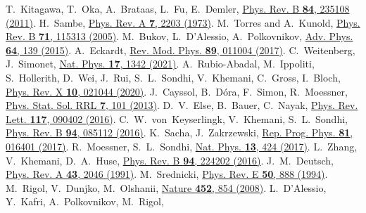 \documentclass[prl,aps,twocolumn,notitlepage,10pt]{revtex4-1}
\begin{document}
\begin{references}
  T.~Kitagawa, T.~Oka, A.~Brataas, L.~Fu, E.~Demler,
  \href{https://doi.org/10.1103/PhysRevB.84.235108}{Phys. Rev. B {\bf 84}, 235108 (2011)}.
  H.~Sambe,
  \href{https://doi.org/10.1103/PhysRevA.7.2203}{Phys. Rev. A {\bf 7}, 2203 (1973)}.
  M.~Torres and A.~Kunold,
  \href{https://doi.org/10.1103/PhysRevB.71.115313}{Phys. Rev. B {\bf 71}, 115313 (2005)}.
  M.~Bukov, L.~D'Alessio, A.~Polkovnikov,
  \href{https://doi.org/10.1080/00018732.2015.1055918}{Adv. Phys. {\bf 64}, 139 (2015)}.
  A.~Eckardt,
  \href{https://doi.org/10.1103/RevModPhys.89.011004}{Rev. Mod. Phys. {\bf 89}, 011004 (2017)}.
  C.~Weitenberg, J.~Simonet,
  \href{https://doi.org/10.1038/s41567-021-01316-x}{Nat. Phys. {\bf 17}, 1342 (2021)}.
  A.~Rubio-Abadal, M.~Ippoliti, S.~Hollerith, D.~Wei, J.~Rui, S.~L.~Sondhi, V.~Khemani, C.~Gross, I.~Bloch,
  \href{https://doi.org/10.1103/PhysRevX.10.021044}{Phys. Rev. X {\bf 10}, 021044 (2020)}.
  J.~Cayssol, B.~Dóra, F.~Simon, R.~Moessner,
  \href{https://doi.org/10.1002/pssr.201206451}{Phys. Stat. Sol. RRL {\bf 7}, 101 (2013)}.
  D.~V.~Else, B.~Bauer, C.~Nayak,
  \href{https://doi.org/10.1103/PhysRevLett.117.090402}{Phys. Rev. Lett. {\bf 117}, 090402 (2016)}.
  C.~W.~von~Keyserlingk, V.~Khemani, S.~L.~Sondhi,
  \href{https://doi.org/10.1103/PhysRevB.94.085112}{Phys. Rev. B {\bf 94}, 085112 (2016)}.
  K.~Sacha, J.~Zakrzewski,
  \href{https://doi.org/10.1088/1361-6633/aa8b38}{Rep. Prog. Phys. {\bf 81}, 016401 (2017)}.
  R.~Moessner, S.~L.~Sondhi,
  \href{https://doi.org/10.1038/nphys4106}{Nat. Phys. {\bf 13}, 424 (2017)}.
  L.~Zhang, V.~Khemani, D.~A.~Huse,
  \href{https://doi.org/10.1103/PhysRevB.94.224202}{Phys. Rev. B {\bf 94}, 224202 (2016)}.
  J.~M.~Deutsch,
  \href{https://doi.org/10.1103/PhysRevA.43.2046}{Phys. Rev. A {\bf 43}, 2046 (1991)}.
  M.~Srednicki,
  \href{https://doi.org/10.1103/PhysRevE.50.888}{Phys. Rev. E {\bf 50}, 888 (1994)}.
  M.~Rigol, V.~Dunjko, M.~Olshanii,
  \href{https://doi.org/10.1038/nature06838}{Nature {\bf 452}, 854 (2008)}.
  L.~D’Alessio, Y.~Kafri, A.~Polkovnikov, M.~Rigol,

\end{references}
\end{document}
